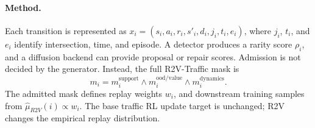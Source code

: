 \paragraph{Method.}
Each transition is represented as \(x_i=(s_i,a_i,r_i,s'_i,d_i,j_i,t_i,e_i)\), where \(j_i\), \(t_i\), and \(e_i\) identify intersection, time, and episode. A detector produces a rarity score \(\rho_i\), and a diffusion backend can provide proposal or repair scores. Admission is not decided by the generator. Instead, the full R2V-Traffic mask is
\[
m_i=m_i^{\mathrm{support}}\land m_i^{\mathrm{ood/value}}\land m_i^{\mathrm{dynamics}}.
\]
The admitted mask defines replay weights \(w_i\), and downstream training samples from \(\hat{\mu}_{R2V}(i)\propto w_i\). The base traffic RL update target is unchanged; R2V changes the empirical replay distribution.
